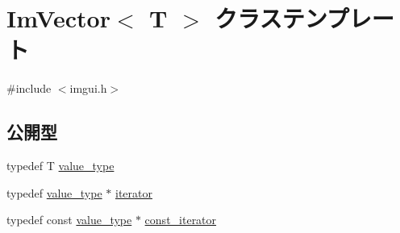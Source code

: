 \hypertarget{class_im_vector}{}\section{Im\+Vector$<$ T $>$ クラステンプレート}
\label{class_im_vector}


{\ttfamily \#include $<$imgui.\+h$>$}

\subsection*{公開型}
\begin{DoxyCompactItemize}
\item 
typedef T \mbox{\hyperlink{class_im_vector_a8bd77e4e7581d8e5f9e98d7c2f3c2a80}{value\+\_\+type}}
\item 
typedef \mbox{\hyperlink{class_im_vector_a8bd77e4e7581d8e5f9e98d7c2f3c2a80}{value\+\_\+type}} $\ast$ \mbox{\hyperlink{class_im_vector_a74b5478f1f6fd471cc71219bce483db6}{iterator}}
\item 
typedef const \mbox{\hyperlink{class_im_vector_a8bd77e4e7581d8e5f9e98d7c2f3c2a80}{value\+\_\+type}} $\ast$ \mbox{\hyperlink{class_im_vector_aedeac9c5080f9d6ce96ae837768ee4c4}{const\+\_\+iterator}}
\end{DoxyCompactItemize}
